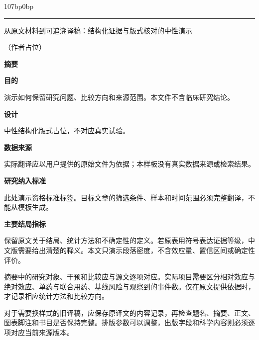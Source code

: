 \documentclass[UTF8,fontset=none,scheme=plain]{ctexart}
\renewcommand{\normalsize}{\fontsize{8.8bp}{11.6bp}\selectfont}
\newcommand{\BMJLabel}[1]{\par\smallskip\noindent\textcolor{BMJBlue}{\sffamily\bfseries #1}\par\nobreak\noindent}
\begin{document}
\normalsize
{}
\begin{adjustwidth}{107bp}{0bp}
\noindent\rule{\linewidth}{.35bp}\par\vspace{3bp}
{\sffamily\fontsize{17bp}{20.5bp}\selectfont\noindent 从原文材料到可追溯译稿：结构化证据与版式核对的中性演示\par}\vspace{7bp}
{\sffamily\fontsize{8.5bp}{11.3bp}\selectfont\noindent\SampleAuthors\quad（作者占位）\par}\vspace{10bp}
\noindent\begin{minipage}[t]{203bp}\sffamily\fontsize{8.1bp}{10.5bp}\selectfont\setlength{\parindent}{0pt}
\textbf{摘要}
\BMJLabel{目的}演示如何保留研究问题、比较方向和来源范围。本文件不含临床研究结论。
\BMJLabel{设计}中性结构化版式占位，不对应真实试验。
\BMJLabel{数据来源}实际翻译应以用户提供的原始文件为依据；本样板没有真实数据来源或检索结果。
\BMJLabel{研究纳入标准}此处演示资格标准标签。目标文章的筛选条件、样本和时间范围必须完整翻译，不能从模板生成。
\BMJLabel{主要结局指标}保留原文关于结局、统计方法和不确定性的定义。若原表用符号表达证据等级，中文版需要给出清楚的释义。本文只演示段落密度，不含效应量、置信区间或确定性评价。\par
摘要中的研究对象、干预和比较应与源文逐项对应。实际项目需要区分相对效应与绝对效应、单药与联合用药、基线风险与观察到的事件数。仅在原文提供依据时，才记录相应统计方法和比较方向。\par\smallskip
对于需要换样式的旧译稿，应保存原译文的内容记录，再检查题名、摘要、正文、图表脚注和书目是否保持完整。排版参数可以调整，出版字段和科学内容则必须逐项对应当前来源版本。
\par\vspace{12bp}
\end{minipage}
\end{adjustwidth}
\end{document}
